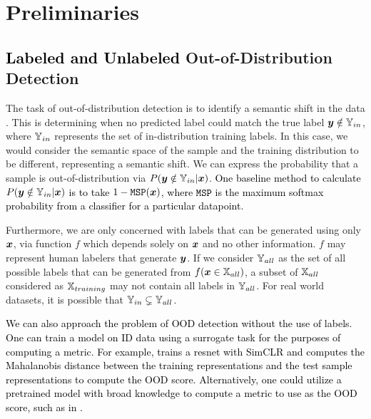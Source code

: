 \documentclass{article} %
\theoremstyle{plain}
\theoremstyle{definition}
\theoremstyle{remark}
\begin{document}
\vspace{-2mm}\section{Preliminaries}
\label{theorycontra}\vspace{-2mm}



\subsection{\textcolor{black}{Labeled and Unlabeled} Out-of-Distribution Detection}\vspace{-2mm}

The task of out-of-distribution detection is to identify a semantic shift in the data \citep{yang2021generalized}. This is determining when no predicted label could match the true label ${\bm{y}} \notin {\mathbb{Y}}_{in}$, where ${\mathbb{Y}}_{in}$ represents the set of in-distribution training labels. In this case, we would consider the semantic space of the sample and the training distribution to be different, representing a semantic shift. We can express the probability that a sample is out-of-distribution via $P({\bm{y}} \notin {\mathbb{Y}}_{in} | {\bm{x}})$. \textcolor{black}{One baseline method to calculate $P({\bm{y}} \notin {\mathbb{Y}}_{in} | {\bm{x}})$ is to take $1 - \texttt{MSP}({\bm{x}})$, where $\texttt{MSP}$ is the maximum softmax probability from a classifier for a particular datapoint.}


Furthermore, we are only concerned with labels that can be generated using only ${\bm{x}}$, via function $f$ which depends solely on ${\bm{x}}$ and no other information. $f$ may represent human labelers that generate ${\bm{y}}$. If we consider ${\mathbb{Y}}_{all}$ as the set of all possible labels that can be generated from $f({\bm{x}} \in {\mathbb{X}}_{all})$, a subset of ${\mathbb{X}}_{all}$ considered as ${\mathbb{X}}_{training}$ may not contain all labels in ${\mathbb{Y}}_{all}$. For real world datasets, it is possible that ${\mathbb{Y}}_{in} \subsetneq {\mathbb{Y}}_{all}$.

\textcolor{black}{We can also approach the problem of OOD detection without the use of labels. One can train a model on ID data using a surrogate task for the purposes of computing a metric. For example, \citep{sehwag2021ssd} trains a resnet with SimCLR and computes the Mahalanobis distance between the training representations and the test sample representations to compute the OOD score. Alternatively, one could utilize a pretrained model with broad knowledge to compute a metric to use as the OOD score, such as in \citep{wang2023clipn}. }
\end{document}
